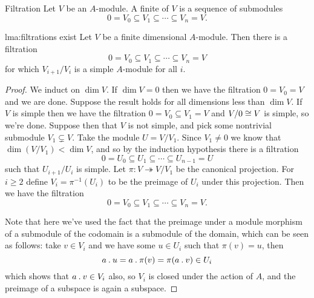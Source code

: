 \begin{dfn}{Filtration}{}
    Let \(V\) be an \(A\)-module.
    A finite  of \(V\) is a sequence of submodules
    \begin{equation}
        0 = V_0 \subseteq V_1 \subseteq \dotsb \subseteq V_n = V.
    \end{equation}
\end{dfn}

\begin{lma}{}{lma:filtrations exist}
    Let \(V\) be a finite dimensional \(A\)-module.
    Then there is a filtration
    \begin{equation}
        0 = V_0 \subseteq V_1 \subseteq \dotsb \subseteq V_n = V
    \end{equation}
    for which \(V_{i+1}/V_i\) is a simple \(A\)-module for all \(i\).
    \begin{proof}
        We induct on \(\dim V\).
        If \(\dim V = 0\) then we have the filtration \(0 = V_0 = V\) and we are done.
        Suppose the result holds for all dimensions less than \(\dim V\).
        If \(V\) is simple then we have the filtration \(0 = V_0 \subseteq V_1 = V\) and \(V/0 \cong V\) is simple, so we're done.
        Suppose then that \(V\) is not simple, and pick some nontrivial submodule \(V_1 \subsetneq V\).
        Take the module \(U = V/V_1\).
        Since \(V_1 \ne 0\) we know that \(\dim (V / V_1) < \dim V\), and so by the induction hypothesis there is a filtration
        \begin{equation}
            0 = U_0 \subseteq U_1 \subseteq \dotsb \subseteq U_{n-1} = U
        \end{equation}
        such that \(U_{i+1}/U_i\) is simple.
        Let \(\pi \colon V \twoheadrightarrow V/V_1\) be the canonical projection.
        For \(i \ge 2\) define \(V_i = \pi^{-1}(U_i)\) to be the preimage of \(U_i\) under this projection.
        Then we have the filtration
        \begin{equation}
            0 = V_0 \subseteq V_1 \subseteq \dotsb \subseteq V_n = V.
        \end{equation}
        
        Note that here we've used the fact that the preimage under a module morphism of a submodule of the codomain is a submodule of the domain, which can be seen as follows: take \(v \in V_i\) and we have some \(u \in U_i\) such that \(\pi(v) = u\), then
        \begin{equation}
            a \mathbin{.} u = a \mathbin{.} \pi(v) = \pi(a \mathbin{.} v) \in U_i
        \end{equation}
        which shows that \(a \mathbin{.} v \in V_i\) also, so \(V_i\) is closed under the action of \(A\), and the preimage of a subspace is again a subspace.
        

\end{proof}
\end{lma}
